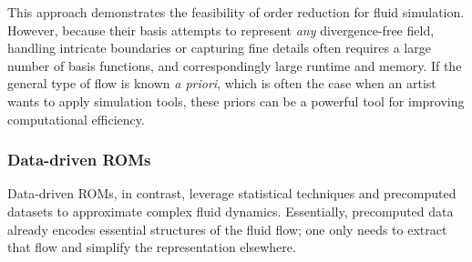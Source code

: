 This approach demonstrates the feasibility of order reduction for fluid simulation. However, because their basis attempts to represent \emph{any} divergence-free field, handling intricate boundaries or capturing fine details often requires a large number of basis functions, and correspondingly large runtime and memory. If the general type of flow is known \emph{a priori}, which is often the case when an artist wants to apply simulation tools, these priors can be a powerful tool for improving computational efficiency.

\subsubsection{Data-driven ROMs}
Data-driven ROMs, in contrast, leverage statistical techniques and precomputed datasets to approximate complex fluid dynamics. 
Essentially, precomputed data already encodes essential structures of the fluid flow; one only needs to extract that flow and simplify the representation elsewhere. 

